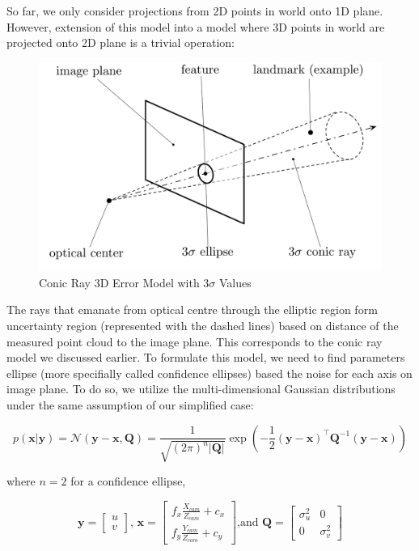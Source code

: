 \documentclass[a4paper]{report}
\numberwithin{figure}{section}
\begin{document}
So far, we only consider projections from 2D points in world onto 1D plane. 
However, extension of this model into a model where 3D points in world are 
projected onto 2D plane is a trivial operation: 

\begin{figure}[H]
	\centering
  \includegraphics[width=0.7\linewidth,natwidth=640,natheight=640]
  {fig/ref_imgs/conic_ray_3d_model.png}
  \caption{Conic Ray 3D Error Model with $3\sigma$ Values}
	\label{fig:conic_ray_3d_error_model}
\end{figure}

The rays that emanate from optical centre through the elliptic region form 
uncertainty region (represented with the dashed lines) 
based on distance of the measured point cloud to the image plane. This 
corresponds to the conic ray model we discussed earlier. To formulate this model, we need to 
find parameters ellipse (more specifially called confidence ellipses) 
based the noise for each axis on image plane.
To do so, we utilize the multi-dimensional Gaussian distributions under the 
same assumption of our simplified case:

\begin{equation}
  p(\mathbf{x}|\mathbf{y}) = \mathcal{N}(\mathbf{y}-\mathbf{x, \mathbf{Q}}) = 
  \frac{1}{\sqrt{(2\pi)^n|\mathbf{Q}|}} 
  \exp(-\frac{1}{2} (\mathbf{y}-\mathbf{x})^\intercal \mathbf{Q}^{-1} (\mathbf{y}-\mathbf{x}))
\end{equation}

where $n=2$ for a confidence ellipse,

\begin{equation}
  \mathbf{y} = \begin{bmatrix}u \\ v \end{bmatrix} \text{, } 
  \mathbf{x} = \begin{bmatrix} f_x \frac{X_{cam}}{Z_{cam}} + c_x \\ f_y \frac{Y_{cam}}{Z_{cam}} + c_y \end{bmatrix} \text{,and }
  \mathbf{Q} = \begin{bmatrix} \sigma_u^2 & 0 \\ 0 & \sigma_v^2 \end{bmatrix}
\end{equation}
\end{document}
